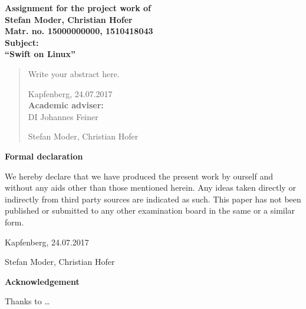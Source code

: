 \begin{titlepage}

\begin{center}\large\bf
Assignment for the project work of\\
Stefan Moder, Christian Hofer\\
Matr. no. 15000000000, 1510418043
\\[2ex]
Subject:\\
``Swift on Linux''
\end{center}

\begin{abstract}
Write your abstract here.

Kapfenberg, 24.07.2017\\[1.5ex]
{\bf Academic adviser:}\\
DI Johannes Feiner

\flushright
\vspace{15mm}
Stefan Moder, Christian Hofer
\end{abstract}

\end{titlepage}



\chapterend

\begin{titlepage}


\begin{center}\large\bf
Formal declaration
\end{center}

We hereby declare that we have produced the present work by ourself and without any aids other than those mentioned herein. Any ideas taken directly or indirectly from third party sources are indicated as such. This paper has not been published or submitted to any other examination board in the same or a similar form.

\vspace{1,5cm}
Kapfenberg, 24.07.2017

\flushright
\vspace{15mm}
Stefan Moder, Christian Hofer

\end{titlepage}



\chapterend

\begin{titlepage}

\begin{center}\large\bf
Acknowledgement
\end{center}
Thanks to \ldots

\end{titlepage}



\chapterend
